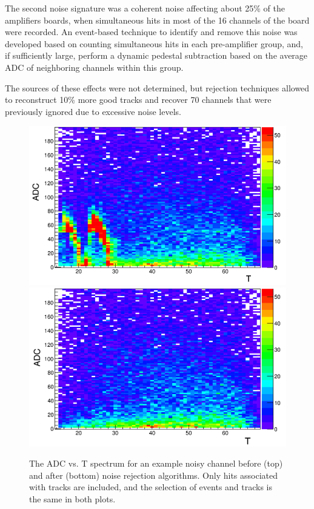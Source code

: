 \documentclass[preprint,5p]{elsarticle}
\begin{document}
The second noise signature was a coherent noise affecting about 25\% of the 
amplifiers boards, when simultaneous hits in most of the 16 channels of the
board were recorded. An event-based technique to identify and remove this noise was developed based 
on counting simultaneous hits in each pre-amplifier group, and, if sufficiently large, 
perform a dynamic pedestal subtraction based on the average ADC of neighboring 
channels within this group.

The sources of these effects were not determined, but rejection techniques 
allowed to reconstruct 10\% more good tracks and 
recover 70 channels that were previously ignored due to excessive noise levels.

\begin{figure}[tb!]\centering
\includegraphics[scale=0.25]{fig/noisy_pad_before_rejection2.png}
\includegraphics[scale=0.25]{fig/noisy_pad_after_rejection2.png}
\caption{The ADC vs. T spectrum for an example noisy channel before (top) and 
after (bottom) noise rejection algorithms.  Only hits associated with tracks 
are included, and the selection of events and tracks is the same in both 
plots.}
\label{fig:noise}
\end{figure}
\end{document}
